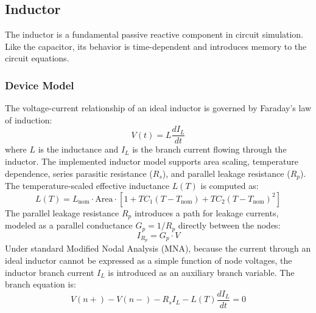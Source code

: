 \subsection{Inductor}
The inductor is a fundamental passive reactive component in circuit simulation. Like the capacitor, its behavior is time-dependent and introduces memory to the circuit equations.

\subsubsection{Device Model}
The voltage-current relationship of an ideal inductor is governed by Faraday's law of induction:
\begin{equation}
    V(t) = L \frac{d I_L}{dt}
\end{equation}
where $L$ is the inductance and $I_L$ is the branch current flowing through the inductor.
The implemented inductor model supports area scaling, temperature dependence, series parasitic resistance ($R_s$), and parallel leakage resistance ($R_p$). The temperature-scaled effective inductance $L(T)$ is computed as:
\begin{equation}
    L(T) = L_{\text{nom}} \cdot \text{Area} \cdot \left[ 1 + TC_1 (T - T_{\text{nom}}) + TC_2 (T - T_{\text{nom}})^2 \right]
\end{equation}
The parallel leakage resistance $R_p$ introduces a path for leakage currents, modeled as a parallel conductance $G_p = 1/R_p$ directly between the nodes:
\begin{equation}
    I_{R_p} = G_p \cdot V
\end{equation}
Under standard Modified Nodal Analysis (MNA), because the current through an ideal inductor cannot be expressed as a simple function of node voltages, the inductor branch current $I_L$ is introduced as an auxiliary branch variable. The branch equation is:
\begin{equation}
    V(n+) - V(n-) - R_s I_L - L(T) \frac{d I_L}{dt} = 0
\end{equation}

